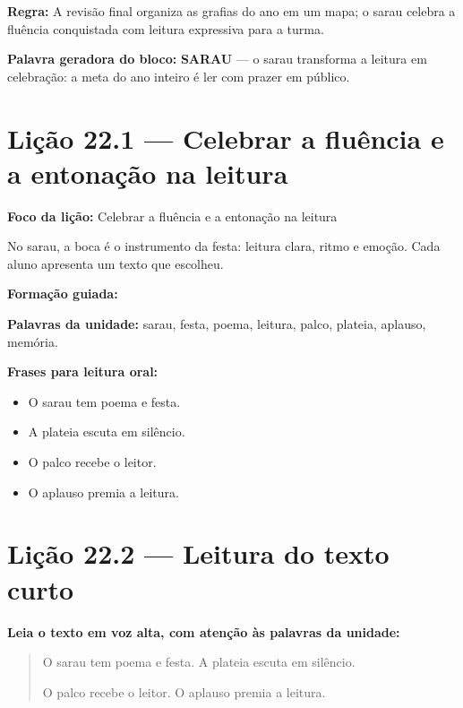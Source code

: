\textbf{Regra:} A revisão final organiza as grafias do ano em um mapa; o sarau celebra a fluência conquistada com leitura expressiva para a turma.

\textbf{Palavra geradora do bloco:} \textbf{SARAU} --- o sarau transforma a leitura em celebração: a meta do ano inteiro é ler com prazer em público.

\section{Lição 22.1 --- Celebrar a fluência e a entonação na leitura}

\textbf{Foco da lição:} Celebrar a fluência e a entonação na leitura


\begin{boquinha}
No sarau, a boca é o instrumento da festa: leitura clara, ritmo e emoção. Cada aluno apresenta um texto que escolheu.
\end{boquinha}

\noindent\textbf{Formação guiada:}

\begin{center}
\end{center}

\noindent\textbf{Palavras da unidade:} sarau, festa, poema, leitura, palco, plateia, aplauso, memória.

\noindent\textbf{Frases para leitura oral:}
\begin{itemize}[leftmargin=1.6em]
  \item O sarau tem poema e festa.
  \item A plateia escuta em silêncio.
  \item O palco recebe o leitor.
  \item O aplauso premia a leitura.
\end{itemize}

\section{Lição 22.2 --- Leitura do texto curto}

\noindent\textbf{Leia o texto em voz alta, com atenção às palavras da unidade:}


\begin{quote}
O sarau tem poema e festa. A plateia escuta em silêncio.

O palco recebe o leitor. O aplauso premia a leitura.
\end{quote}

